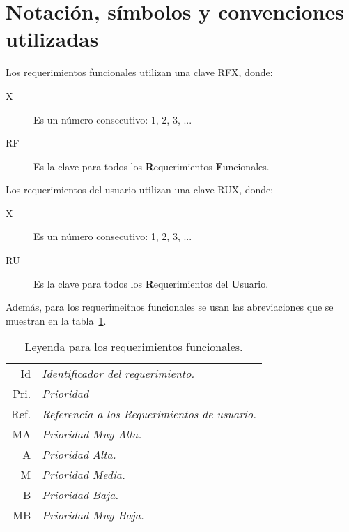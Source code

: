 	
	

\section{Notación, símbolos y convenciones utilizadas}

	Los requerimientos funcionales utilizan una clave RFX, donde:
	
\begin{description}
	\item[X] Es un número consecutivo: 1, 2, 3, ...
	\item[RF] Es la clave para todos los {\bf R}equerimientos {\bf F}uncionales.
\end{description}

	Los requerimientos del usuario utilizan una clave RUX, donde:
	
\begin{description}
	\item[X] Es un número consecutivo: 1, 2, 3, ...
	\item[RU] Es la clave para todos los {\bf R}equerimientos del {\bf U}suario.
\end{description}

	Además, para los requerimeitnos funcionales se usan las abreviaciones que se muestran en la tabla~\ref{tbl:leyendaRF}.
\begin{table}[hbtp!]
	\begin{center}
    \begin{tabular}{|r l|}
	    \hline
    	{\footnotesize Id} & {\footnotesize\em Identificador del requerimiento.}\\
    	{\footnotesize Pri.} & {\footnotesize\em Prioridad}\\
    	{\footnotesize Ref.} & {\footnotesize\em Referencia a los Requerimientos de usuario.}\\
    	{\footnotesize MA} & {\footnotesize\em Prioridad Muy Alta.}\\
    	{\footnotesize A} & {\footnotesize\em Prioridad Alta.}\\
    	{\footnotesize M} & {\footnotesize\em Prioridad Media.}\\
    	{\footnotesize B} & {\footnotesize\em Prioridad Baja.}\\
    	{\footnotesize MB} & {\footnotesize\em Prioridad Muy Baja.}\\
		\hline
    \end{tabular} 
    \caption{Leyenda para los requerimientos funcionales.}
    \label{tbl:leyendaRF}
	\end{center}
\end{table}